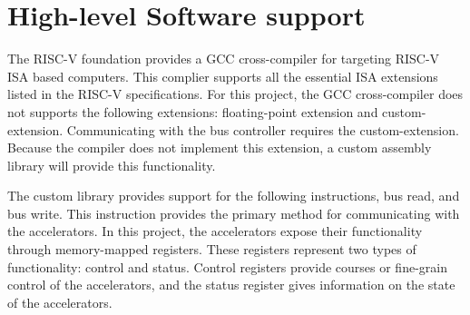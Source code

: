 \documentclass[../main.tex]{subfiles}
\begin{document}
\section{High-level Software support}
The RISC-V foundation provides a GCC cross-compiler for targeting RISC-V ISA based computers. This complier supports all the essential ISA extensions listed in the RISC-V specifications. For this project, the GCC cross-compiler does not supports the following extensions: floating-point extension and custom-extension. Communicating with the bus controller requires the custom-extension. Because the compiler does not implement this extension, a custom assembly library will provide this functionality.  

The custom library provides support for the following instructions, bus read, and bus write. This instruction provides the primary method for communicating with the accelerators.  In this project, the accelerators expose their functionality through memory-mapped registers. These registers represent two types of functionality: control and status. Control registers provide courses or fine-grain control of the accelerators, and the status register gives information on the state of the accelerators. 
\end{document}
